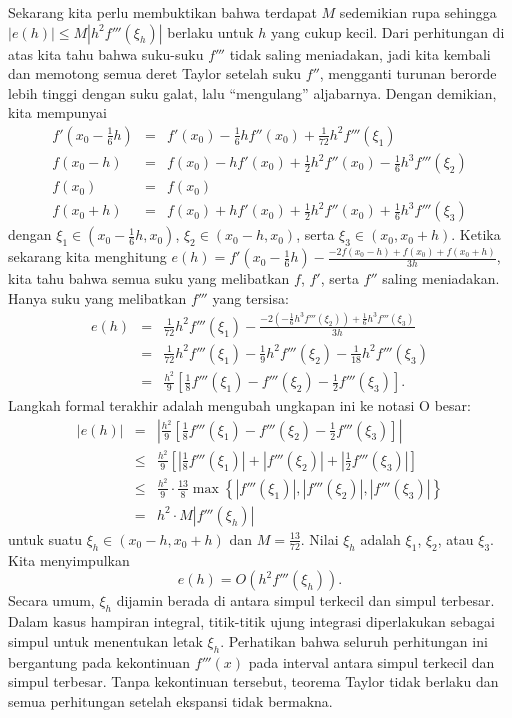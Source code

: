 Sekarang kita perlu membuktikan bahwa terdapat $M$ sedemikian rupa
sehingga $|e(h)|\leq M|h^{2}f'''(\xi_{h})|$ berlaku untuk $h$ yang
cukup kecil. Dari perhitungan di atas kita tahu bahwa suku-suku $f'''$
tidak saling meniadakan, jadi kita kembali dan memotong semua deret
Taylor setelah suku $f''$, mengganti turunan berorde lebih tinggi
dengan suku galat, lalu ``mengulang'' aljabarnya. Dengan demikian,
kita mempunyai
\begin{eqnarray*}
f'\left(x_{0}-\frac{1}{6}h\right) & = & f'(x_{0})-\frac{1}{6}hf''(x_{0})+\frac{1}{72}h^{2}f'''(\xi_{1})\\
f(x_{0}-h) & = & f(x_{0})-hf'(x_{0})+\frac{1}{2}h^{2}f''(x_{0})-\frac{1}{6}h^{3}f'''(\xi_{2})\\
f(x_{0}) & = & f(x_{0})\\
f(x_{0}+h) & = & f(x_{0})+hf'(x_{0})+\frac{1}{2}h^{2}f''(x_{0})+\frac{1}{6}h^{3}f'''(\xi_{3})
\end{eqnarray*}
dengan $\xi_{1}\in(x_{0}-\frac{1}{6}h,x_{0})$, $\xi_{2}\in(x_{0}-h,x_{0})$,
serta $\xi_{3}\in(x_{0},x_{0}+h)$. Ketika sekarang kita menghitung
$e(h)=f'\left(x_{0}-\frac{1}{6}h\right)-\frac{-2f(x_{0}-h)+f(x_{0})+f(x_{0}+h)}{3h}$,
kita tahu bahwa semua suku yang melibatkan $f$, $f'$, serta $f''$
saling meniadakan. Hanya suku yang melibatkan $f'''$ yang tersisa:
\begin{eqnarray*}
e(h) & = & \frac{1}{72}h^{2}f'''(\xi_{1})-\frac{-2(-\frac{1}{6}h^{3}f'''(\xi_{2}))+\frac{1}{6}h^{3}f'''(\xi_{3})}{3h}\\
 & = & \frac{1}{72}h^{2}f'''(\xi_{1})-\frac{1}{9}h^{2}f'''(\xi_{2})-\frac{1}{18}h^{2}f'''(\xi_{3})\\
 & = & \frac{h^{2}}{9}\left[\frac{1}{8}f'''(\xi_{1})-f'''(\xi_{2})-\frac{1}{2}f'''(\xi_{3})\right].
\end{eqnarray*}
Langkah formal terakhir adalah mengubah ungkapan ini ke notasi O besar:
\begin{eqnarray*}
|e(h)| & = & \left|\frac{h^{2}}{9}\left[\frac{1}{8}f'''(\xi_{1})-f'''(\xi_{2})-\frac{1}{2}f'''(\xi_{3})\right]\right|\\
 & \leq & \frac{h^{2}}{9}\left[\left|\frac{1}{8}f'''(\xi_{1})\right|+\left|f'''(\xi_{2})\right|+\left|\frac{1}{2}f'''(\xi_{3})\right|\right]\\
 & \leq & \frac{h^{2}}{9}\cdot\frac{13}{8}\max\left\{ \left|f'''(\xi_{1})\right|,\left|f'''(\xi_{2})\right|,\left|f'''(\xi_{3})\right|\right\} \\
 & = & h^{2}\cdot M\left|f'''(\xi_{h})\right|
\end{eqnarray*}
 untuk suatu $\xi_{h}\in(x_{0}-h,x_{0}+h)$ dan $M=\frac{13}{72}$.
Nilai $\xi_{h}$ adalah $\xi_{1}$, $\xi_{2}$, atau $\xi_{3}$. Kita
menyimpulkan
\[
e(h)=O(h^{2}f'''(\xi_{h})).
\]
Secara umum, $\xi_{h}$ dijamin berada di antara simpul terkecil
dan simpul terbesar. Dalam kasus hampiran integral, titik-titik ujung
integrasi diperlakukan sebagai simpul untuk menentukan letak $\xi_{h}$.
Perhatikan bahwa seluruh perhitungan ini bergantung pada kekontinuan
$f'''(x)$ pada interval antara simpul terkecil dan simpul terbesar.
Tanpa kekontinuan tersebut, teorema Taylor tidak berlaku dan semua
perhitungan setelah ekspansi tidak bermakna.

